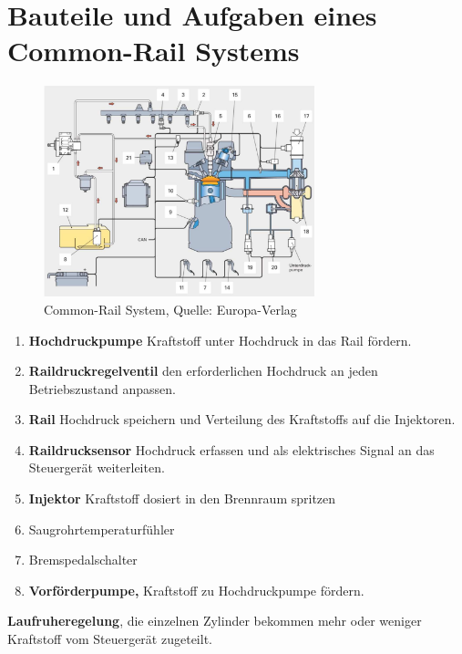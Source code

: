 \section{Bauteile und Aufgaben eines Common-Rail
Systems}\label{bauteile-und-aufgaben-eines-common-rail-systems}

\begin{figure}[!ht]%
\centering
\includegraphics[width=0.7\textwidth]{images/Diesel/Diesel-6.pdf}
\caption{Common-Rail System, Quelle: Europa-Verlag}
\end{figure}

\begin{enumerate}
\item
  \textbf{Hochdruckpumpe} Kraftstoff unter Hochdruck in das Rail
  fördern.
\item
  \textbf{Raildruckregelventil} den erforderlichen Hochdruck an jeden
  Betriebszustand anpassen.
\item
  \textbf{Rail} Hochdruck speichern und Verteilung des Kraftstoffs auf
  die Injektoren.
\item
  \textbf{Raildrucksensor} Hochdruck erfassen und als elektrisches
  Signal an das Steuergerät weiterleiten.
\item
  \textbf{Injektor} Kraftstoff dosiert in den Brennraum spritzen
\item
  Saugrohrtemperaturfühler
\item
  Bremspedalschalter
\item
  \textbf{Vorförderpumpe,} Kraftstoff zu Hochdruckpumpe fördern.
\end{enumerate}

\textbf{Laufruheregelung}, die einzelnen Zylinder bekommen mehr oder
weniger Kraftstoff vom Steuergerät zugeteilt.

